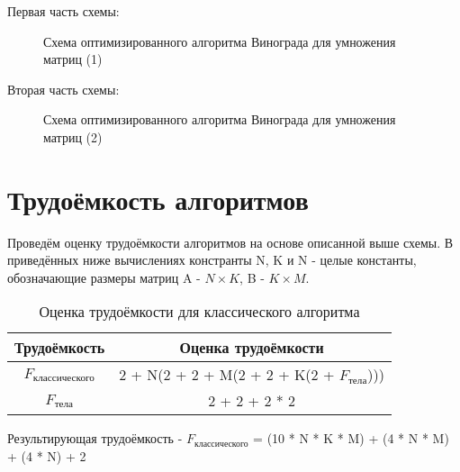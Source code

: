 Первая часть схемы:
\begin{figure}[ph!]
	\caption{Схема оптимизированного алгоритма Винограда для умножения матриц (1)}
\end{figure}

\newpage
Вторая часть схемы:
\begin{figure}[ph!]
	\caption{Схема оптимизированного алгоритма Винограда для умножения матриц (2)}
\end{figure}

\section{Трудоёмкость алгоритмов}
Проведём оценку трудоёмкости алгоритмов на основе описанной выше схемы. В приведённых ниже вычислениях констранты N, K и N - целые константы, обозначающие размеры матриц A - $N \times K$, B - $K \times M$. 

\begin{table}[h!]
  \begin{center}
    \captionsetup{justification=raggedright}
    \caption{Оценка трудоёмкости для классического алгоритма}
    \label{tab:workcost_classic}
    \begin{tabular}{c|c}
      \textbf{Трудоёмкость} & \textbf{Оценка трудоёмкости}\\
      \hline
	$F_{\text{классического}}$ & 2 + N(2 + 2 + M(2 + 2 + K(2 + $F_{\text{тела}}$)))\\
	$F_{\text{тела}}$ & 2 + 2 + 2 * 2
    \end{tabular}
  \end{center}
\end{table}
Результирующая трудоёмкость - $F_{\text{классического}}$ = (10 * N * K * M) + (4 * N * M) + (4 * N) + 2

